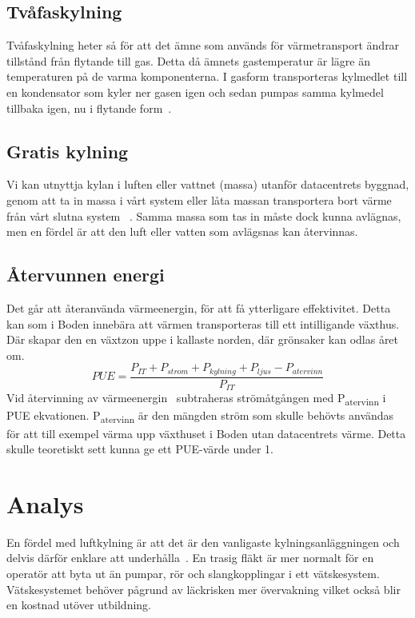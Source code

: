 \documentclass[conference,a4paper]{IEEEtran}
\begin{document}
\subsection{Tvåfaskylning}
Tvåfaskylning heter så för att det ämne som används för värmetransport ändrar tillstånd från flytande till gas. Detta då ämnets gastemperatur är lägre 
än temperaturen på de varma komponenterna. I gasform transporteras kylmedlet till en kondensator som kyler ner gasen igen och sedan pumpas samma kylmedel tillbaka igen, 
nu i flytande form~\cite{energycompare2}.  
\subsection{Gratis kylning}
Vi kan utnyttja kylan i luften eller vattnet (massa) utanför datacentrets byggnad, genom att ta in massa i vårt system eller låta massan transportera bort värme från vårt slutna 
system ~\cite{free-cooling2}. Samma massa som tas in måste dock kunna avlägnas, men en fördel är att den luft eller vatten som avlägsnas kan återvinnas.
\subsection{Återvunnen energi}
Det går att återanvända värmeenergin, för att få ytterligare effektivitet. Detta kan som i Boden \cite{free-cooling1} innebära att värmen transporteras 
till ett intilligande växthus. Där skapar den en växtzon uppe i kallaste norden, där grönsaker kan odlas året om. 
\begin{equation}
    PUE = \frac{P_{IT} + P_{strom} + P_{kylning} + P_{ljus} - P_{atervinn}}{P_{IT}}
\end{equation}
Vid återvinning av värmeenergin~\cite{modelling2} subtraheras strömåtgången med P\textsubscript{atervinn} i PUE ekvationen. P\textsubscript{atervinn} är den mängden ström 
som skulle behövts användas för att till exempel värma upp växthuset i Boden utan datacentrets värme. Detta skulle teoretiskt sett kunna ge
ett PUE-värde under 1.

\section{Analys}
En fördel med luftkylning är att det är den vanligaste kylningsanläggningen och delvis därför enklare att underhålla~\cite{coolingcompare1}. 
En trasig fläkt är mer normalt för en operatör att byta ut än pumpar, rör och slangkopplingar i ett vätskesystem. Vätskesystemet behöver pågrund av läckrisken mer övervakning 
vilket också blir en kostnad utöver utbildning.
\end{document}
